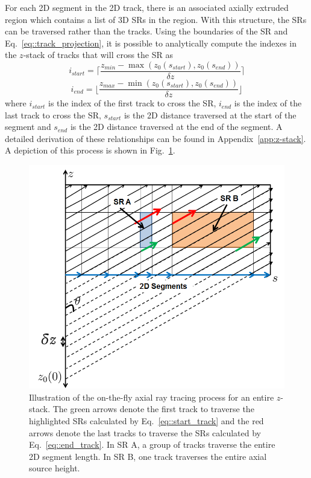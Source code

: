 For each 2D segment in the 2D track, there is an associated axially extruded region which contains a list of 3D \ac{SR}s in the region. With this structure, the \ac{SR}s can be traversed rather than the tracks. Using the boundaries of the \ac{SR} and Eq.~\ref{eq::track_projection}, it is possible to analytically compute the indexes in the $z$-stack of tracks that will cross the \ac{SR} as
\begin{equation}
i_{\textit{start}} = \Bigg\lceil\frac{z_{\textit{min}} - \max\left({z_0(s_{\textit{start}}), z_0(s_{\textit{end}})}\right) }{\delta z}\Bigg\rceil
\label{eq::start_track}
\end{equation}
\begin{equation}
i_{\textit{end}} = \Bigg\lfloor\frac{z_{\textit{max}} - \min\left({z_0(s_{\textit{start}}), z_0(s_{\textit{end}})}\right) }{\delta z}\Bigg\rfloor
\label{eq::end_track}
\end{equation}
where $i_{\textit{start}}$ is the index of the first track to cross the \ac{SR}, $i_{\textit{end}}$ is the index of the last track to cross the \ac{SR}, $s_{\textit{start}}$ is the 2D distance traversed at the start of the segment and $s_{\textit{end}}$ is the 2D distance traversed at the end of the segment. A detailed derivation of these relationships can be found in Appendix~\ref{app:z-stack}. A depiction of this process is shown in Fig.~\ref{fig::stack_tracing}.

\begin{figure}[ht!]
	\centering
	\includegraphics[width=0.75\linewidth]{figures/ph2016/stack_tracing.png}
	\caption{Illustration of the on-the-fly axial ray tracing process for an entire $z$-stack. The green arrows denote the first track to traverse the highlighted \ac{SR}s calculated by Eq.~\ref{eq::start_track} and the red arrows denote the last tracks to traverse the \ac{SR}s calculated by Eq.~\ref{eq::end_track}. In \ac{SR} A, a group of tracks traverse the entire 2D segment length. In \ac{SR} B, one track traverses the entire axial source height.}
	\label{fig::stack_tracing}
\end{figure}


